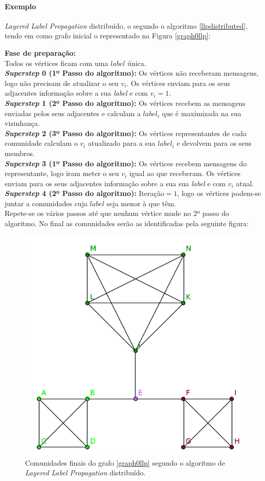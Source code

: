 \clearpage

 \paragraph{Exemplo} \textit{Layered Label Propagation} distribuído, o  segundo 
o algoritmo \ref{llpdistributed}, tendo em como grafo inicial o representado na 
Figura \ref{graph0llp}:

{\bf Fase de preparação:}\\
Todos os vértices ficam com uma $label$ única. 
\\[0.25cm]
{\bf \textit{Superstep} 0  (1º Passo do algoritmo):}
Os vértices não receberam mensagens, logo não precisam de atualizar o seu $v_i$.
Os vértices enviam para os seus adjacentes informação sobre a sua 
\textit{label} e com $v_i=1$.
\\[0.25cm]
{\bf \textit{Superstep} 1 (2º Passo do algoritmo):}
Os vértices recebem as mensagens enviadas pelos seus adjacentes e calculam a 
$label_i$ que é maximizada na sua vizinhança. 
\\[0.25cm]
{\bf \textit{Superstep} 2 (3º Passo do algoritmo):} Os vértices representantes 
de cada comunidade calculam o $v_i$ atualizado para a sua $label_i$ e devolvem 
para os seus membros.
\\[0.25cm]
{\bf \textit{Superstep} 3 (1º Passo do algoritmo):}
Os vértices recebem mensagens do representante, logo iram meter o seu $v_i$ 
igual ao que receberam.
Os vértices enviam para os seus adjacentes informação sobre a sua sua 
\textit{label} e com $v_i$ atual.
\\[0.25cm]
{\bf \textit{Superstep} 4 (2º Passo do algoritmo):}
Iteração$ = 1$, 
logo os vértices podem-se juntar a comunidades cuja $label$ seja menor à que 
têm.
\\[0.25cm]
Repete-se os vários passos até que nenhum vértice mude no 2º passo do 
algoritmo. No final as comunidades serão as identificadas pela seguinte figura:

\begin{figure}[h]
  \center
  \includegraphics{graph1_end}
  \caption{Comunidades finais do grafo \ref{graph0llp} segundo o algoritmo de 
\textit{Layered Label Propagation} distribuído.}
\end{figure}
